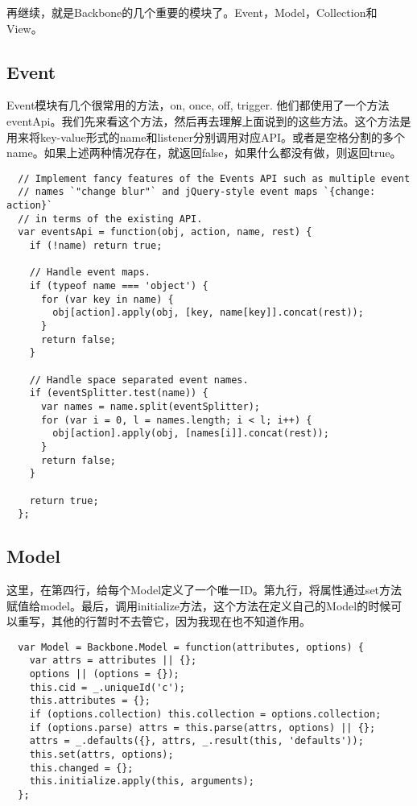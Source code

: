     再继续，就是Backbone的几个重要的模块了。Event，Model，Collection和View。

    \subsection{Event}
    Event模块有几个很常用的方法，on, once, off, trigger. 他们都使用了一个方法eventApi。我们先来看这个方法，然后再去理解上面说到的这些方法。这个方法是用来将key-value形式的name和listener分别调用对应API。或者是空格分割的多个name。如果上述两种情况存在，就返回false，如果什么都没有做，则返回true。

    \begin{lstlisting}
  // Implement fancy features of the Events API such as multiple event
  // names `"change blur"` and jQuery-style event maps `{change: action}`
  // in terms of the existing API.
  var eventsApi = function(obj, action, name, rest) {
    if (!name) return true;

    // Handle event maps.
    if (typeof name === 'object') {
      for (var key in name) {
        obj[action].apply(obj, [key, name[key]].concat(rest));
      }
      return false;
    }

    // Handle space separated event names.
    if (eventSplitter.test(name)) {
      var names = name.split(eventSplitter);
      for (var i = 0, l = names.length; i < l; i++) {
        obj[action].apply(obj, [names[i]].concat(rest));
      }
      return false;
    }

    return true;
  };
    \end{lstlisting}

  \subsection{Model}
  这里，在第四行，给每个Model定义了一个唯一ID。第九行，将属性通过set方法赋值给model。最后，调用initialize方法，这个方法在定义自己的Model的时候可以重写，其他的行暂时不去管它，因为我现在也不知道作用。
  \begin{lstlisting}
  var Model = Backbone.Model = function(attributes, options) {
    var attrs = attributes || {};
    options || (options = {});
    this.cid = _.uniqueId('c');
    this.attributes = {};
    if (options.collection) this.collection = options.collection;
    if (options.parse) attrs = this.parse(attrs, options) || {};
    attrs = _.defaults({}, attrs, _.result(this, 'defaults'));
    this.set(attrs, options);
    this.changed = {};
    this.initialize.apply(this, arguments);
  };
  \end{lstlisting}

